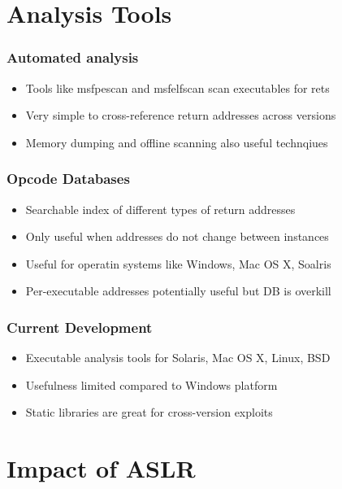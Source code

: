 \documentclass{beamer}
\begin{document}
\section{Analysis Tools}
\begin{frame}
	\frametitle{Automated analysis}
	\begin{itemize}
		\item Tools like msfpescan and msfelfscan scan executables for rets
		\item Very simple to cross-reference return addresses across versions
		\item Memory dumping and offline scanning also useful technqiues
	\end{itemize}	
\end{frame}

\begin{frame}
	\frametitle{Opcode Databases}
	\begin{itemize}
		\item Searchable index of different types of return addresses
		\item Only useful when addresses do not change between instances
		\item Useful for operatin systems like Windows, Mac OS X, Soalris
		\item Per-executable addresses potentially useful but DB is overkill
	\end{itemize}	
\end{frame}

\begin{frame}
	\frametitle{Current Development}
	\begin{itemize}
		\item Executable analysis tools for Solaris, Mac OS X, Linux, BSD
		\item Usefulness limited compared to Windows platform
		\item Static libraries are great for cross-version exploits
	\end{itemize}	
\end{frame}

\section{Impact of ASLR}
\end{document}
